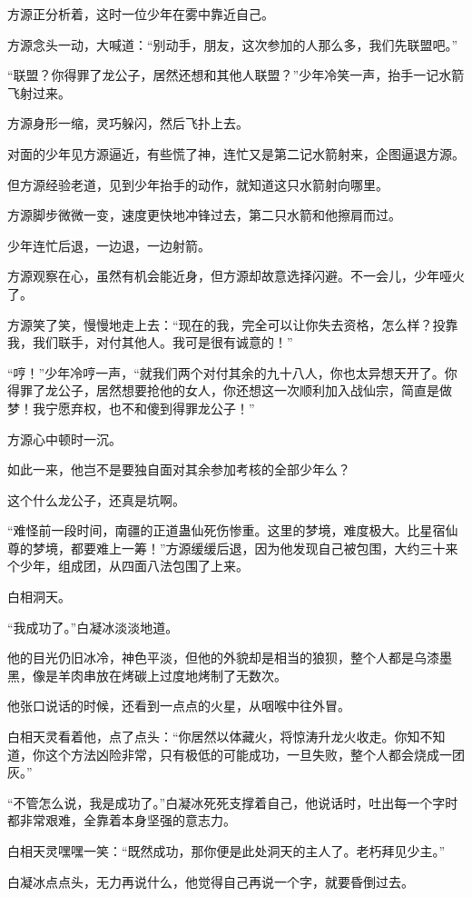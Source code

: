\begin{this_body}
方源正分析着，这时一位少年在雾中靠近自己。

方源念头一动，大喊道：“别动手，朋友，这次参加的人那么多，我们先联盟吧。”

“联盟？你得罪了龙公子，居然还想和其他人联盟？”少年冷笑一声，抬手一记水箭飞射过来。

方源身形一缩，灵巧躲闪，然后飞扑上去。

对面的少年见方源逼近，有些慌了神，连忙又是第二记水箭射来，企图逼退方源。

但方源经验老道，见到少年抬手的动作，就知道这只水箭射向哪里。

方源脚步微微一变，速度更快地冲锋过去，第二只水箭和他擦肩而过。

少年连忙后退，一边退，一边射箭。

方源观察在心，虽然有机会能近身，但方源却故意选择闪避。不一会儿，少年哑火了。

方源笑了笑，慢慢地走上去：“现在的我，完全可以让你失去资格，怎么样？投靠我，我们联手，对付其他人。我可是很有诚意的！”

“哼！”少年冷哼一声，“就我们两个对付其余的九十八人，你也太异想天开了。你得罪了龙公子，居然想要抢他的女人，你还想这一次顺利加入战仙宗，简直是做梦！我宁愿弃权，也不和傻到得罪龙公子！”

方源心中顿时一沉。

如此一来，他岂不是要独自面对其余参加考核的全部少年么？

这个什么龙公子，还真是坑啊。

“难怪前一段时间，南疆的正道蛊仙死伤惨重。这里的梦境，难度极大。比星宿仙尊的梦境，都要难上一筹！”方源缓缓后退，因为他发现自己被包围，大约三十来个少年，组成团，从四面八法包围了上来。

白相洞天。

“我成功了。”白凝冰淡淡地道。

他的目光仍旧冰冷，神色平淡，但他的外貌却是相当的狼狈，整个人都是乌漆墨黑，像是羊肉串放在烤碳上过度地烤制了无数次。

他张口说话的时候，还看到一点点的火星，从咽喉中往外冒。

白相天灵看着他，点了点头：“你居然以体藏火，将惊涛升龙火收走。你知不知道，你这个方法凶险非常，只有极低的可能成功，一旦失败，整个人都会烧成一团灰。”

“不管怎么说，我是成功了。”白凝冰死死支撑着自己，他说话时，吐出每一个字时都非常艰难，全靠着本身坚强的意志力。

白相天灵嘿嘿一笑：“既然成功，那你便是此处洞天的主人了。老朽拜见少主。”

白凝冰点点头，无力再说什么，他觉得自己再说一个字，就要昏倒过去。


\end{this_body}
